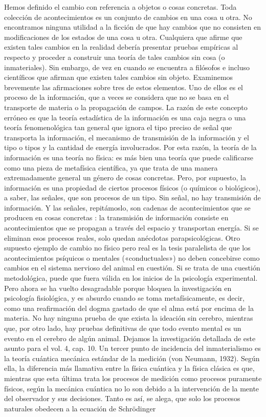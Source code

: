 \begin{justifying}
\begin{justifying}
Hemos definido el cambio con referencia a objetos o cosas concretas.
Toda colección de acontecimientos es un conjunto de cambios en una cosa u otra. No
encontramos ninguna utilidad a la ficción de que hay cambios que no
consisten en modificaciones de los estados de una cosa u otra. Cualquiera que
afirme que existen tales cambios en la realidad debería presentar pruebas empíricas
al respecto y proceder a construir una teoría de tales cambios sin cosa (o
inmateriales).
Sin embargo, de vez en cuando se encuentra a filósofos e incluso científicos
que afirman que existen tales cambios sin objeto. Examinemos
brevemente las afirmaciones sobre tres de estos elementos. Uno de ellos es el proceso de la información,
 que a veces se considera que no se basa en el transporte de
materia o la propagación de campos. La razón de este concepto erróneo es
que la teoría estadística de la información es una caja negra o una teoría fenomenológica
tan general que ignora el tipo preciso de señal que transporta la
información, el mecanismo de transmisión de la información y el tipo o tipos
y la cantidad de energía involucrados. Por esta razón, la teoría de la información es una
teoría no física: es más bien una teoría que puede calificarse como una pieza de
metafísica científica, ya que trata de una manera extremadamente general un
género de cosas concretas. Pero, por supuesto, la información es una propiedad de
ciertos procesos físicos (o químicos o biológicos), a saber, las señales,
que son procesos de un tipo. Sin señal, no hay transmisión de información.
Y las señales, repitámoslo, son cadenas de acontecimientos que se producen en cosas concretas
: la transmisión de información consiste en acontecimientos que se propagan
a través del espacio y transportan energía. Si se eliminan esos procesos reales, solo
quedan anécdotas parapsicológicas.
Otro supuesto ejemplo de cambio no físico pero real es la
tesis paralelista de que los acontecimientos psíquicos o mentales («conductuales») no
deben concebirse como cambios en el sistema nervioso del animal
en cuestión. Si se trata de una cuestión metodológica, puede que fuera válida en
los inicios de la psicología experimental. Pero ahora se ha vuelto
desagradable porque bloquea la investigación en psicología fisiológica, y es
absurdo cuando se toma metafísicamente, es decir, como una reafirmación del dogma gastado
de que el alma está por encima de la materia. No hay ninguna prueba de que
exista la ideación sin cerebro, mientras que, por otro lado, hay pruebas definitivas
de que todo evento mental es un evento en el cerebro de algún animal. Dejamos
la investigación detallada de este asunto para el vol. 4, cap. 10.
Un tercer punto de incidencia del inmaterialismo es la teoría cuántica
mecánica estándar de la medición (von Neumann, 1932). Según
ella, la diferencia más llamativa entre la física cuántica y la física clásica
es que, mientras que esta última trata los procesos de medición como procesos puramente
físicos, según la mecánica cuántica no lo son
debido a la intervención de la mente del observador y sus decisiones. Tanto es así, se alega, que solo los procesos naturales obedecen a la ecuación de Schrödinger


\end{justifying}
\end{justifying}
